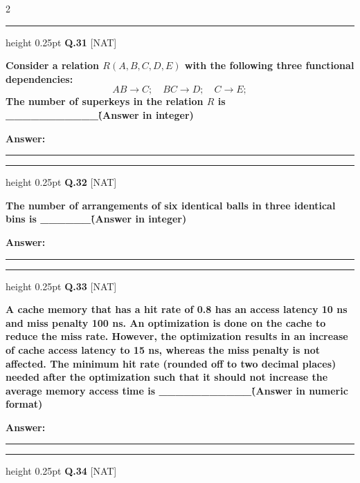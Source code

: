 \documentclass[a4paper,10pt,twoside]{article}
\begin{document}
\begin{multicols}{2}
\par\vspace{6pt}\hrule height 0.25pt\vspace{6pt}
\noindent\textbf{Q.31} \hfill {\footnotesize\textsf{[NAT]}}
\par\vspace{2pt}
{\bfseries Consider a relation $R(A, B, C, D, E)$ with the following three functional dependencies:
\[ AB \to C; \quad BC \to D; \quad C \to E; \]
The number of superkeys in the relation $R$ is \_\_\_\_\_\_\_\_\_\_\_\. (Answer in integer) \par}
\par\vspace{3pt}\noindent\textbf{Answer:} \rule{3.2cm}{0.4pt}
\par\vspace{6pt}\hrule height 0.25pt\vspace{6pt}
\noindent\textbf{Q.32} \hfill {\footnotesize\textsf{[NAT]}}
\par\vspace{2pt}
{\bfseries The number of arrangements of six identical balls in three identical bins is \_\_\_\_\_\_\. (Answer in integer) \par}
\par\vspace{3pt}\noindent\textbf{Answer:} \rule{3.2cm}{0.4pt}
\par\vspace{6pt}\hrule height 0.25pt\vspace{6pt}
\noindent\textbf{Q.33} \hfill {\footnotesize\textsf{[NAT]}}
\par\vspace{2pt}
{\bfseries A cache memory that has a hit rate of 0.8 has an access latency 10 ns and miss penalty 100 ns. An optimization is done on the cache to reduce the miss rate. However, the optimization results in an increase of cache access latency to 15 ns, whereas the miss penalty is not affected. The minimum hit rate (rounded off to two decimal places) needed after the optimization such that it should not increase the average memory access time is \_\_\_\_\_\_\_\_\_\_\_\. (Answer in numeric format) \par}
\par\vspace{3pt}\noindent\textbf{Answer:} \rule{3.2cm}{0.4pt}
\par\vspace{6pt}\hrule height 0.25pt\vspace{6pt}
\noindent\textbf{Q.34} \hfill {\footnotesize\textsf{[NAT]}}

\end{multicols}
\end{document}
